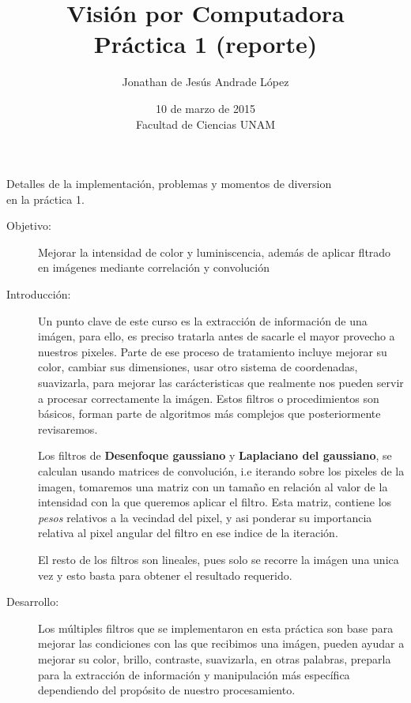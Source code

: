 \documentclass[12pt]{article}
\title{Visi\'on por Computadora  \\Pr\'actica 1 (reporte)}
\author{Jonathan de Jes\'us Andrade L\'opez}
\date{10 de marzo de 2015 \\Facultad de Ciencias UNAM}
\begin{document}
\maketitle
Detalles de la implementaci\'on, problemas y momentos de diversion\\
en la pr\'actica 1.

\begin{description}
  \item[Objetivo:] 
  Mejorar la intensidad de color y luminiscencia, adem\'as de aplicar fltrado
  en im\'agenes mediante correlaci\'on y convoluci\'on
  
  \item[Introducci\'on:]
  Un punto clave de este curso es la extracci\'on de informaci\'on de una im\'agen,
  para ello, es preciso tratarla antes de sacarle el mayor provecho a nuestros pixeles.
  Parte de ese proceso de tratamiento incluye mejorar su color, cambiar sus dimensiones, usar otro sistema de coordenadas,
  suavizarla, para mejorar las car\'acteristicas que realmente nos pueden servir a procesar
  correctamente la im\'agen. Estos filtros o procedimientos son b\'asicos, forman parte 
  de algoritmos m\'as complejos que posteriormente revisaremos.
  
  Los filtros de \textbf{Desenfoque gaussiano} y \textbf{Laplaciano del gaussiano}, se calculan
  usando matrices de convoluci\'on, i.e iterando sobre los pixeles de la imagen, tomaremos
  una matriz con un tama$ñ$o en relaci\'on al valor de la intensidad con la que queremos aplicar el filtro.
  Esta matriz, contiene los \textit{pesos} relativos a la vecindad del pixel, y asi ponderar su importancia
  relativa al pixel angular del filtro en ese indice de la iteraci\'on.
  
  El resto de los filtros son lineales, pues solo se recorre la im\'agen una unica vez y esto basta
  para obtener el resultado requerido.
  
  \item[Desarrollo:] 
  Los m\'ultiples filtros que se implementaron en esta pr\'actica son base para mejorar las condiciones con
  las que recibimos una im\'agen, pueden ayudar a mejorar su color, brillo, contraste, suavizarla, en otras 
  palabras, preparla para la extracci\'on de informaci\'on y manipulaci\'on m\'as espec\'ifica dependiendo 
  del prop\'osito de nuestro procesamiento.
  

\end{description}
\end{document}
